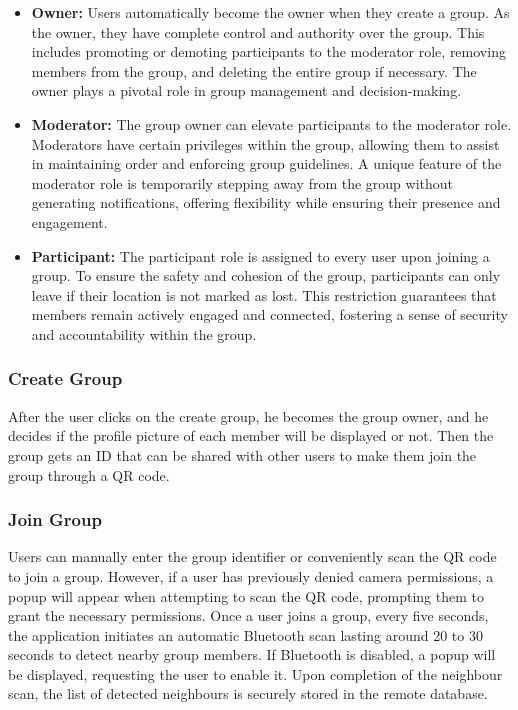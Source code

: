 \begin{itemize}
\item \textbf{Owner:} Users automatically become the owner when they create a group. As the owner, they have complete control and authority over the group. This includes promoting or demoting participants to the moderator role, removing members from the group, and deleting the entire group if necessary. The owner plays a pivotal role in group management and decision-making.

\item \textbf{Moderator:} The group owner can elevate participants to the moderator role. Moderators have certain privileges within the group, allowing them to assist in maintaining order and enforcing group guidelines. A unique feature of the moderator role is temporarily stepping away from the group without generating notifications, offering flexibility while ensuring their presence and engagement.

\item \textbf{Participant:} The participant role is assigned to every user upon joining a group. To ensure the safety and cohesion of the group, participants can only leave if their location is not marked as lost. This restriction guarantees that members remain actively engaged and connected, fostering a sense of security and accountability within the group.
\end{itemize}

\newpage
\subsubsection*{Create Group}
After the user clicks on the create group, he becomes the group owner, and he decides if the profile picture of each member will be displayed or not.  Then the group gets an ID that can be shared with other users to make them join the group through a QR code.

\subsubsection*{Join Group}
Users can manually enter the group identifier or conveniently scan the QR code to join a group. However, if a user has previously denied camera permissions, a popup will appear when attempting to scan the QR code, prompting them to grant the necessary permissions. Once a user joins a group, every five seconds, the application initiates an automatic Bluetooth scan lasting around 20 to 30 seconds to detect nearby group members. If Bluetooth is disabled, a popup will be displayed, requesting the user to enable it. Upon completion of the neighbour scan, the list of detected neighbours is securely stored in the remote database.

